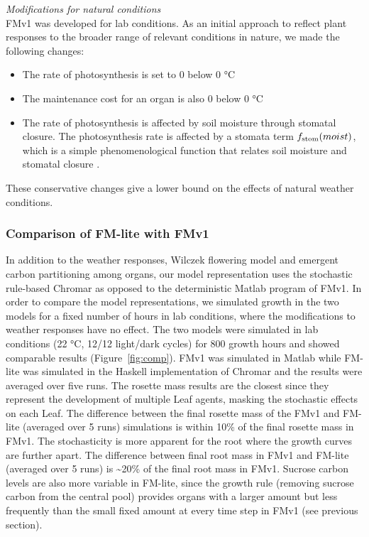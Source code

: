 \emph{Modifications for natural conditions}\\
FMv1 was developed for lab conditions. As an initial approach to reflect
plant responses to the broader range of relevant conditions in nature,
we made the following changes:

\begin{itemize}
\item
  The rate of photosynthesis is set to 0 below 0 °C
\item
  The maintenance cost for an organ is also 0 below 0 °C
\item
  The rate of photosynthesis is affected by soil moisture through
  stomatal closure. The photosynthesis rate is affected by a stomata
  term \(f_{\mathrm{stom}}(moist)\), which is a simple phenomenological
  function that relates soil moisture and stomatal closure \citep{france_mathematical_1984}.
\end{itemize}

These conservative changes give a lower bound on the effects of natural
weather conditions.

\subsubsection*{Comparison of FM-lite with FMv1}
\label{comparison-of-fm-lite-with-fmv1}

In addition to the weather responses, Wilczek flowering model and emergent
carbon partitioning among organs, our model representation uses the stochastic
rule-based Chromar as opposed to the deterministic Matlab program of FMv1. In
order to compare the model representations, we simulated growth in the two
models for a fixed number of hours in lab conditions, where the modifications to
weather responses have no effect.  The two models were simulated in lab
conditions (22 °C, 12/12 light/dark cycles) for \(800\) growth hours and showed
comparable results (Figure~\ref{fig:comp}). FMv1 was simulated in Matlab while
FM-lite was simulated in the Haskell implementation of Chromar and the results
were averaged over five runs. The rosette mass results are the closest since
they represent the development of multiple Leaf agents, masking the stochastic
effects on each Leaf. The difference between the final rosette mass of the FMv1
and FM-lite (averaged over 5 runs) simulations is within 10\% of the final
rosette mass in FMv1. The stochasticity is more apparent for the root where the
growth curves are further apart. The difference between final root mass in FMv1
and FM-lite (averaged over 5 runs) is \textasciitilde{}20\% of the final root
mass in FMv1. Sucrose carbon levels are also more variable in FM-lite, since the
growth rule (removing sucrose carbon from the central pool) provides organs with
a larger amount but less frequently than the small fixed amount at every time
step in FMv1 (see previous section).

